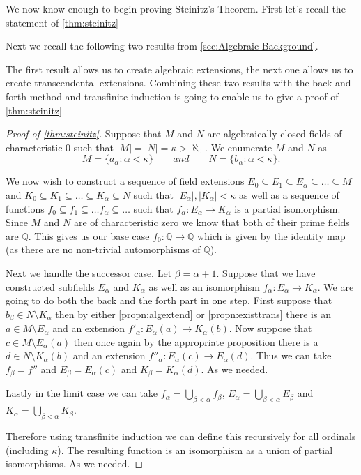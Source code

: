 We now know enough to begin proving Steinitz's Theorem. First let's
recall the statement of \cref{thm:steinitz}

\steinitz*

Next we recall the following two results from \cref{sec:Algebraic Background}.

\algextend*

\transextend*

The first result allows us to create algebraic extensions, the next one allows
us to create transcendental extensions. Combining these two results with the
back and forth method and transfinite induction is going to enable us to give
a proof of \cref{thm:steinitz}

\begin{proof}[Proof of \cref{thm:steinitz}]
  Suppose that $M$ and $N$ are algebraically closed fields of characteristic
  0 such that $|M| = |N| = \kappa > \aleph_{0}$. We enumerate $M$ and $N$ as
  \[
  M = \{a_{\alpha}: \alpha < \kappa\} \qquad and \qquad N = \{b_{\alpha}:
  \alpha < \kappa\} 
  .\] 

  We now wish to construct a sequence of field extensions $E_0 \subseteq E_1
  \subseteq E_{\alpha} \subseteq \ldots \subseteq M$ and $K_0 \subseteq K_1
  \subseteq \ldots \subseteq K_{\alpha} \subseteq N$ such that $|E_{\alpha}|,
  |K_{\alpha}| < \kappa$
  as well as a sequence of
  functions $f_0 \subseteq f_1 \subseteq \ldots f_{\alpha} \subseteq \ldots$
  such that $f_{\alpha}: E_{\alpha} \to K_{\alpha}$ is a partial isomorphism.
  Since $M$ and $N$ are of characteristic zero we know that both of their prime
  fields are $\mathbb{Q}$. This gives us our base case $f_0: \mathbb{Q} \to
  \mathbb{Q}$ which is given by the identity map (as there are no non-trivial
  automorphisms of $\mathbb{Q}$).

  Next we handle the successor case. Let $\beta = \alpha + 1$.
  Suppose that we have constructed subfields
  $E_{\alpha}$ and $K_{\alpha}$ as well as an isomorphism $f_{\alpha}:
  E_{\alpha} \to K_{\alpha}$. We are going to do both the back and the forth
  part in one step. First suppose that $b_{\beta} \in N \setminus K_{\alpha}$ then by
  either \cref{propn:algextend} or \cref{propn:existtrans} there is an $a \in
  M \setminus E_{\alpha}$ and an extension $f'_{\alpha}: E_{\alpha}(a) \to
  K_{\alpha}(b)$. Now suppose that $c \in M \setminus E_{\alpha}(a)$ then once
  again by the appropriate proposition there is a $d \in N \setminus
  K_{\alpha}(b)$ and an extension $f''_{\alpha}: E_{\alpha}(c) \to
  E_{\alpha}(d)$. Thus we can take $f_{\beta} = f''$ and $E_{\beta}
  = E_{\alpha}(c)$ and $K_{\beta} = K_{\alpha}(d)$. As we needed.

  Lastly in the limit case we can take $f_{\alpha} = \bigcup_{\beta < \alpha}
  f_{\beta}$, $E_{\alpha} = \bigcup_{\beta < \alpha} E_{\beta}$ and $K_{\alpha}
  = \bigcup_{\beta < \alpha} K_{\beta}$.

  Therefore using transfinite induction we can define this recursively for all
  ordinals (including $\kappa$). The resulting function is an isomorphism as
  a union of partial isomorphisms. As we needed.
\end{proof}


